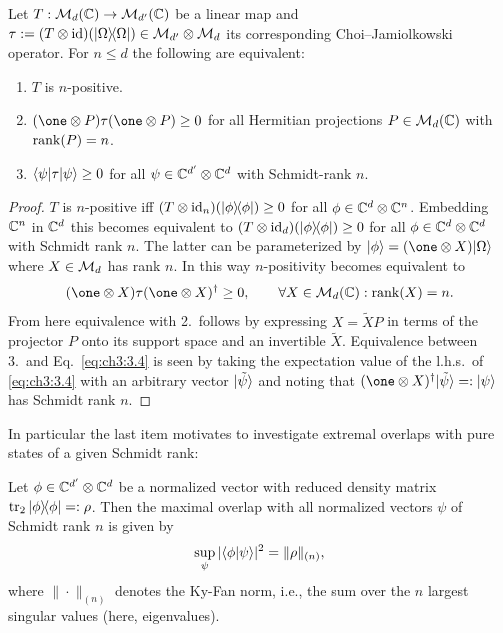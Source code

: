 \documentclass[11pt,a4paper]{article}
\numberwithin{equation}{section}
\begin{document}
\begin{proposition}
    Let $T:\mathcal{M}_d(\mathbb{C})\to \mathcal{M}_{d'}(\mathbb{C})$ be a linear map and
    $\tau:=(T\otimes \mathrm{id})(|\Omega\rangle\!\langle\Omega|)\in \mathcal{M}_{d'}\otimes \mathcal{M}_d$ its corresponding
    Choi--Jamiolkowski operator. For $n\le d$ the following are equivalent:
    \begin{enumerate}
        \item $T$ is $n$-positive.
        \item $(\one\otimes P)\tau(\one\otimes P)\ge 0$ for all Hermitian projections $P\in \mathcal{M}_d(\mathbb{C})$ with $\operatorname{rank}(P)=n$.
        \item $\langle\psi|\tau|\psi\rangle\ge 0$ for all $\psi\in \mathbb{C}^{d'}\otimes \mathbb{C}^d$ with Schmidt-rank $n$.
    \end{enumerate}
\end{proposition}

\begin{proof}
    $T$ is $n$-positive iff $(T\otimes \mathrm{id}_n)(|\phi\rangle\!\langle\phi|)\ge 0$ for all $\phi\in \mathbb{C}^d\otimes \mathbb{C}^n$.
    Embedding $\mathbb{C}^n$ in $\mathbb{C}^d$ this becomes equivalent to $(T\otimes \mathrm{id}_d)(|\phi\rangle\!\langle\phi|)\ge 0$ for all
    $\phi\in \mathbb{C}^d\otimes \mathbb{C}^d$ with Schmidt rank $n$. The latter can be parameterized by
    $\ket{\phi}=(\one\otimes X)\ket{\Omega}$ where $X\in \mathcal{M}_d$ has rank $n$. In this way $n$-positivity becomes
    equivalent to
    \begin{equation}\label{eq:ch3:3.4}
        (\one\otimes X)\tau(\one\otimes X)^\dagger \ge 0,
        \qquad \forall X\in \mcM_d(\CC): \rank(X)=n.
    \end{equation}
    From here equivalence with 2.\ follows by expressing $X=\tilde X P$ in terms of the
    projector $P$ onto its support space and an invertible $\tilde X$.
    Equivalence between 3.\ and Eq.~\eqref{eq:ch3:3.4} is seen by taking the expectation value of the l.h.s.\ of
    \eqref{eq:ch3:3.4} with an arbitrary vector $|\tilde \psi\rangle$ and noting that
    $(\one\otimes X)^\dagger\ket{\tilde \psi}=:\ket{\psi}$ has Schmidt rank $n$.
\end{proof}

In particular the last item motivates to investigate extremal overlaps with pure states of a given Schmidt rank:

\begin{lemma}
    Let $\phi\in \mathbb{C}^{d'}\otimes \mathbb{C}^d$ be a normalized vector with reduced density matrix
    $\operatorname{tr}_2 |\phi\rangle\!\langle\phi| =:\rho$. Then the maximal overlap with all normalized vectors $\psi$ of Schmidt rank
    $n$ is given by
    \begin{equation}\label{eq:ch3:3.5}
        \sup_{\psi} |\langle\phi|\psi\rangle|^2 = \|\rho\|_{(n)},
    \end{equation}
    where $\|\cdot\|_{(n)}$ denotes the Ky-Fan norm, i.e., the sum over the $n$ largest singular values (here,
    eigenvalues).
\end{lemma}
\end{document}
